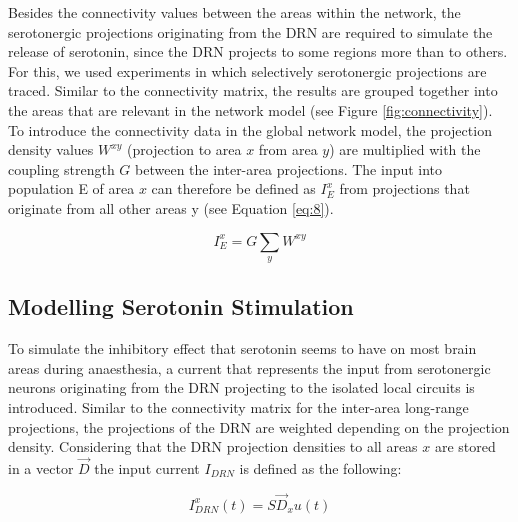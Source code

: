 \indent Besides the connectivity values between the areas within the network, the serotonergic projections originating from the DRN are required to simulate the release of serotonin, since the DRN projects to some regions more than to others. For this, we used experiments in which selectively serotonergic projections are traced. Similar to the connectivity matrix, the results are grouped together into the areas that are relevant in the network model (see Figure \ref{fig:connectivity}). 
\\
\indent To introduce the connectivity data in the global network model, the projection density values $W^{xy}$ (projection to area $x$ from area $y$) are multiplied with the coupling strength $G$ between the inter-area projections. The input into population E of area $x$ can therefore be defined as $I^x_E$ from projections that originate from all other areas y (see Equation \ref{eq:8}). 

\begin{equation}\label{eq:8}
    I^x_E = G \sum_y W^{xy}
\end{equation}



\subsection{Modelling Serotonin Stimulation\label{sec:mss}}

\indent 

To simulate the inhibitory effect that serotonin seems to have on most brain areas during anaesthesia, a current that represents the input from serotonergic neurons originating from the DRN projecting to the isolated local circuits is introduced. Similar to the connectivity matrix for the inter-area long-range projections, the projections of the DRN are weighted depending on the projection density. Considering that the DRN projection densities to all areas $x$ are stored in a vector $\vec{D}$ the input current $I_{DRN}$ is defined as the following:


\begin{equation}\label{eq:9}
    I^x_{DRN}(t) = S\vec{D}_x u(t)
\end{equation}

